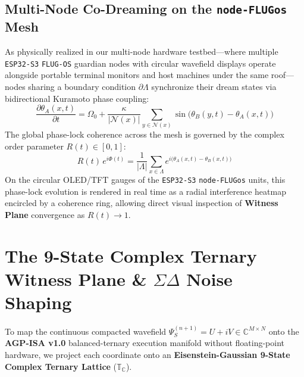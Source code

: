 \documentclass[10pt, twocolumn, a4paper]{article}
\begin{document}
\subsection{Multi-Node Co-Dreaming on the \texttt{node-FLUGos} Mesh}
As physically realized in our multi-node hardware testbed---where multiple \texttt{ESP32-S3} \texttt{FLUG-OS} guardian nodes with circular wavefield displays operate alongside portable terminal monitors and host machines under the same roof---nodes sharing a boundary condition $\partial \Lambda$ synchronize their dream states via bidirectional Kuramoto phase coupling:
\begin{equation}
\frac{\partial \theta_A(x, t)}{\partial t} = \Omega_0 + \frac{\kappa}{|\mathcal{N}(x)|} \sum_{y \in \mathcal{N}(x)} \sin\big(\theta_B(y, t) - \theta_A(x, t)\big)
\end{equation}
The global phase-lock coherence across the mesh is governed by the complex order parameter $R(t) \in [0, 1]$:
\begin{equation}
R(t) \, e^{i \Phi(t)} = \frac{1}{|\Lambda|} \sum_{x \in \Lambda} e^{i \big(\theta_A(x, t) - \theta_B(x, t)\big)}
\end{equation}
On the circular OLED/TFT gauges of the \texttt{ESP32-S3} \texttt{node-FLUGos} units, this phase-lock evolution is rendered in real time as a radial interference heatmap encircled by a coherence ring, allowing direct visual inspection of \textbf{Witness Plane} convergence as $R(t) \to 1$.

\section{The 9-State Complex Ternary Witness Plane \& $\Sigma\Delta$ Noise Shaping}

To map the continuous compacted wavefield $\Psi_S^{(n+1)} = U + iV \in \mathbb{C}^{M \times N}$ onto the \textbf{AGP-ISA v1.0} balanced-ternary execution manifold without floating-point hardware, we project each coordinate onto an \textbf{Eisenstein-Gaussian 9-State Complex Ternary Lattice} ($\mathbb{T}_{\mathbb{C}}$).
\end{document}
